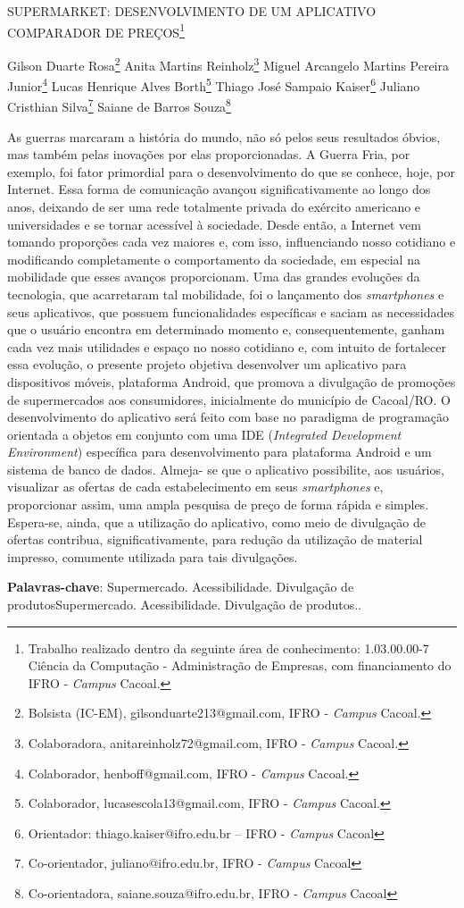 \documentclass[article,12pt,onesidea,4paper,english,brazil]{abntex2}
\begin{document}
	
	
	\frenchspacing 
	
	\begin{center}
		\LARGE SUPERMARKET: DESENVOLVIMENTO DE UM APLICATIVO COMPARADOR DE PREÇOS\footnote{Trabalho realizado dentro da seguinte área de conhecimento: 1.03.00.00-7 Ciência da Computação - Administração de Empresas, com financiamento do IFRO - \textit{Campus} Cacoal.}
		
		\normalsize
		Gilson Duarte Rosa\footnote{Bolsista (IC-EM), gilsonduarte213@gmail.com, IFRO - \textit{Campus} Cacoal.} 
		Anita Martins Reinholz\footnote{Colaboradora, anitareinholz72@gmail.com, IFRO - \textit{Campus} Cacoal.} 
		Miguel Arcangelo Martins Pereira Junior\footnote{Colaborador, henboff@gmail.com, IFRO - \textit{Campus} Cacoal.} 
		Lucas Henrique Alves Borth\footnote{Colaborador, lucasescola13@gmail.com, IFRO - \textit{Campus} Cacoal.}
		Thiago José Sampaio Kaiser\footnote{Orientador: thiago.kaiser@ifro.edu.br – IFRO - \textit{Campus} Cacoal}
		Juliano Cristhian Silva\footnote{Co-orientador, juliano@ifro.edu.br, IFRO - \textit{Campus} Cacoal}
		Saiane de Barros Souza\footnote{Co-orientadora, saiane.souza@ifro.edu.br, IFRO - \textit{Campus} Cacoal} 
	\end{center}
	
	\noindent As guerras marcaram a história do mundo, não só pelos seus resultados óbvios,	mas também pelas inovações por elas proporcionadas. A Guerra Fria, por exemplo, foi fator primordial para o desenvolvimento do que se conhece, hoje, por Internet.
	Essa forma de comunicação avançou significativamente ao longo dos anos,
	deixando de ser uma rede totalmente privada do exército americano e universidades
	e se tornar acessível à sociedade. Desde então, a Internet vem tomando proporções
	cada vez maiores e, com isso, influenciando nosso cotidiano e modificando
	completamente o comportamento da sociedade, em especial na mobilidade que
	esses avanços proporcionam. Uma das grandes evoluções da tecnologia, que
	acarretaram tal mobilidade, foi o lançamento dos \textit{smartphones} e seus aplicativos, que possuem funcionalidades específicas e saciam as necessidades que o usuário
	encontra em determinado momento e, consequentemente, ganham cada vez mais
	utilidades e espaço no nosso cotidiano e, com intuito de fortalecer essa evolução, o presente projeto objetiva desenvolver um aplicativo para dispositivos móveis,
	plataforma Android, que promova a divulgação de promoções de supermercados
	aos consumidores, inicialmente do município de Cacoal/RO. O desenvolvimento do
	aplicativo será feito com base no paradigma de programação orientada a objetos em
	conjunto com uma IDE (\textit{Integrated Development Environment}) específica para 
	desenvolvimento para plataforma Android e um sistema de banco de dados. Almeja-
	se que o aplicativo possibilite, aos usuários, visualizar as ofertas de cada	
	estabelecimento em seus \textit{smartphones} e, proporcionar assim, uma ampla pesquisa
	de preço de forma rápida e simples. Espera-se, ainda, que a utilização do aplicativo,
	como meio de divulgação de ofertas contribua, significativamente, para redução da
	utilização de material impresso, comumente utilizada para tais divulgações.
	
	\vspace{\onelineskip}
	
	\noindent
	\textbf{Palavras-chave}: Supermercado. Acessibilidade. Divulgação de produtosSupermercado. Acessibilidade. Divulgação de produtos..	
	
\end{document}
